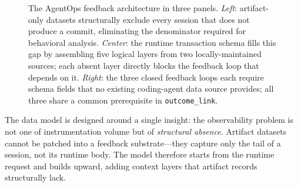\documentclass[sigconf,anonymous,review]{acmart}
\begin{document}
\begin{figure}[!t]
\caption{The AgentOps feedback architecture in three panels.
  \emph{Left}: artifact-only datasets structurally exclude every session that
  does not produce a commit, eliminating the denominator required for
  behavioral analysis.
  \emph{Center}: the runtime transaction schema fills this gap by assembling
  five logical layers from two locally-maintained sources; each absent layer
  directly blocks the feedback loop that depends on it.
  \emph{Right}: the three closed feedback loops each require schema fields
  that no existing coding-agent data source provides; all three share a
  common prerequisite in \texttt{outcome\_link}.}
\label{fig:overview}
\end{figure}

The data model is designed around a single insight: the observability
problem is not one of instrumentation volume but of \emph{structural
absence}. Artifact datasets cannot be patched into a feedback
substrate---they capture only the tail of a session, not its runtime
body. The model therefore starts from the runtime request and builds
upward, adding context layers that artifact records structurally
lack.
\end{document}
